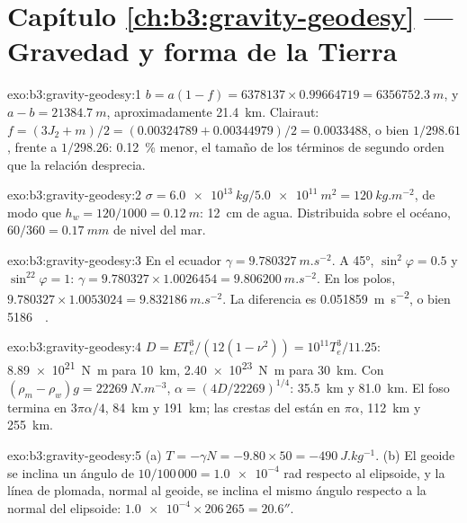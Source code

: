 \section*{Capítulo \ref{ch:b3:gravity-geodesy} --- Gravedad y forma de la Tierra}

\begin{solution}{exo:b3:gravity-geodesy:1}
$b = a(1 - f) = 6378137\times0.99664719 = \qty{6356752.3}{m}$, y
$a - b = \qty{21384.7}{m}$, aproximadamente \qty{21.4}{km}. Clairaut:
$f = (3J_2 + m)/2 = (0.00324789 + 0.00344979)/2 = \num{0.0033488}$, o bien
$1/298.61$, frente a $1/298.26$: \qty{0.12}{\percent} menor, el tamaño de los
términos de segundo orden que la relación desprecia.
\end{solution}

\begin{solution}{exo:b3:gravity-geodesy:2}
$\sigma = \qty{6.0e13}{kg}/\qty{5.0e11}{m^2} = \qty{120}{kg.m^{-2}}$, de modo que
$h_w = 120/1000 = \qty{0.12}{m}$: \qty{12}{cm} de agua. Distribuida sobre el
océano, $60/360 = \qty{0.17}{mm}$ de nivel del mar.
\end{solution}

\begin{solution}{exo:b3:gravity-geodesy:3}
En el ecuador $\gamma = \qty{9.780327}{m.s^{-2}}$. A \ang{45},
$\sin^2\varphi = 0.5$ y $\sin^22\varphi = 1$: $\gamma = 9.780327\times1.0026454
= \qty{9.806200}{m.s^{-2}}$. En los polos, $9.780327\times1.0053024 =
\qty{9.832186}{m.s^{-2}}$. La diferencia es \qty{0.051859}{m.s^{-2}}, o bien
\qty{5186}{\milli\gal}.
\end{solution}

\begin{solution}{exo:b3:gravity-geodesy:4}
$D = ET_e^3/(12(1 - \nu^2)) = 10^{11}T_e^3/11.25$: \qty{8.89e21}{N.m} para
\qty{10}{km}, \qty{2.40e23}{N.m} para \qty{30}{km}. Con $(\rho_m - \rho_w)g =
\qty{22269}{N.m^{-3}}$, $\alpha = (4D/22269)^{1/4}$: \qty{35.5}{km} y
\qty{81.0}{km}. El foso termina en $3\pi\alpha/4$, \qty{84}{km} y \qty{191}{km};
las crestas del  están en $\pi\alpha$, \qty{112}{km} y \qty{255}{km}.
\end{solution}

\begin{solution}{exo:b3:gravity-geodesy:5}
(a) $T = -\gamma N = -9.80\times50 = \qty{-490}{J.kg^{-1}}$. (b) El geoide se inclina
un ángulo de $10/100\,000 = \num{1.0e-4}$ rad respecto al elipsoide, y la
línea de plomada, normal al geoide, se inclina el mismo ángulo respecto a la normal del elipsoide:
$\num{1.0e-4}\times206\,265 = 20.6''$.
\end{solution}

